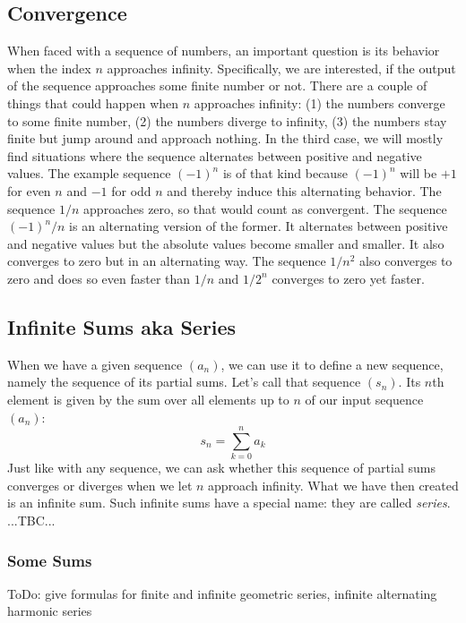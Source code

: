 \subsection{Convergence}
When faced with a sequence of numbers, an important question is its behavior when the index $n$ approaches infinity. Specifically, we are interested, if the output of the sequence approaches some finite number or not. There are a couple of things that could happen when $n$ approaches infinity: (1) the numbers converge to some finite number, (2) the numbers diverge to infinity, (3) the numbers stay finite but jump around and approach nothing. In the third case, we will mostly find situations where the sequence alternates between positive and negative values. The example sequence $(-1)^n$ is of that kind because $(-1)^n$ will be $+1$ for even $n$ and $-1$ for odd $n$ and thereby induce this alternating behavior. The sequence $1/n$ approaches zero, so that would count as convergent. The sequence $(-1)^n / n$ is an alternating version of the former. It alternates between positive and negative values but the absolute values become smaller and smaller. It also converges to zero but in an alternating way. The sequence $1/n^2$ also converges to zero and does so even faster than $1/n$ and $1/2^n$ converges to zero yet faster.






\subsection{Infinite Sums aka Series}
When we have a given sequence $(a_n)$, we can use it to define a new sequence, namely the sequence of its partial sums. Let's call that sequence $(s_n)$. Its $n$th element is given by the sum over all elements up to $n$ of our input sequence $(a_n)$:
\begin{equation}
 s_n = \sum_{k=0}^n a_k
\end{equation}
Just like with any sequence, we can ask whether this sequence of partial sums converges or diverges when we let $n$ approach infinity. What we have then created is an infinite sum. Such infinite sums have a special name: they are called \emph{series}.
...TBC...


\subsubsection{Some Sums}
ToDo: give formulas for finite and infinite geometric series, infinite alternating harmonic series


